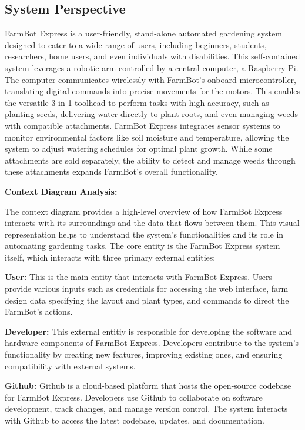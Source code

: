 \subsection{System Perspective}

FarmBot Express is a user-friendly, stand-alone automated gardening system designed to cater to a wide range of users, including beginners, students, researchers, home users, and even individuals with disabilities. This self-contained system leverages a robotic arm controlled by a central computer, a Raspberry Pi. The computer communicates wirelessly with FarmBot's onboard microcontroller, translating digital commands into precise movements for the motors. This enables the versatile 3-in-1 toolhead to perform tasks with high accuracy, such as planting seeds, delivering water directly to plant roots, and even managing weeds with compatible attachments. FarmBot Express integrates sensor systems to monitor environmental factors like soil moisture and temperature, allowing the system to adjust watering schedules for optimal plant growth. While some attachments are sold separately, the ability to detect and manage weeds through these attachments expands FarmBot's overall functionality.

\textbf{Context Diagram Analysis:}

The context diagram provides a high-level overview of how FarmBot Express interacts with its surroundings and the data that flows between them. This visual representation helps to understand the system's functionalities and its role in automating gardening tasks. The core entity is the FarmBot Express system itself, which interacts with three primary external entities:

\textbf{User:} This is the main entity that interacts with FarmBot Express. Users provide various inputs such as credentials for accessing the web interface, farm design data specifying the layout and plant types, and commands to direct the FarmBot's actions.

\textbf{Developer:} This external entitiy is responsible for developing the software and hardware components of FarmBot Express. Developers contribute to the system's functionality by creating new features, improving existing ones, and ensuring compatibility with external systems.

\textbf{Github:} Github is a cloud-based platform that hosts the open-source codebase for FarmBot Express. Developers use Github to collaborate on software development, track changes, and manage version control. The system interacts with Github to access the latest codebase, updates, and documentation.

